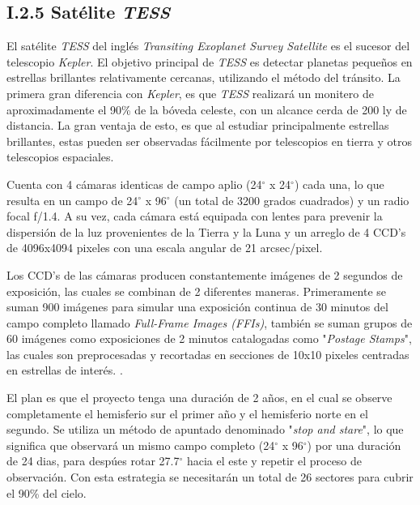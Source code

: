 \subsection*{I.2.5 Satélite \textit{TESS}}

El satélite \textit{TESS} del inglés \textit{Transiting Exoplanet Survey Satellite} es el sucesor del telescopio \textit{Kepler}. El objetivo principal de \textit{TESS} es detectar planetas pequeños en estrellas brillantes relativamente cercanas, utilizando el método del tránsito. La primera gran diferencia con \textit{Kepler}, es que \textit{TESS} realizará un monitero de aproximadamente el 90\% de la bóveda celeste, con un alcance cerda de 200 ly de distancia. La gran ventaja de esto, es que al estudiar principalmente estrellas brillantes, estas pueden ser observadas fácilmente por telescopios en tierra y otros telescopios espaciales. 

Cuenta con 4 cámaras identicas de campo aplio (24$^{\circ}$ x 24$^{\circ}$) cada una, lo que resulta en un campo de 24$^{\circ}$ x 96$^{\circ}$ (un total de 3200 grados cuadrados) y un radio focal f/1.4. A su vez, cada cámara está equipada con lentes para prevenir la dispersión de la luz provenientes de la Tierra y la Luna y un arreglo de 4 CCD’s de 4096x4094 pixeles con una escala angular de 21 arcsec/pixel.

Los CCD's de las cámaras producen constantemente imágenes de 2 segundos de exposición, las cuales se combinan de 2 diferentes maneras. Primeramente se suman 900 imágenes para simular una exposición continua de 30 minutos del campo completo llamado \textit{ Full-Frame Images (FFIs)}, también se suman grupos de 60 imágenes como exposiciones de 2 minutos catalogadas como "\textit{Postage Stamps}", las cuales son preprocesadas y recortadas en secciones de 10x10 pixeles centradas en estrellas de interés. \cite{ricker2014transiting}.

El plan es que el proyecto tenga una duración de 2 años, en el cual se observe completamente el hemisferio sur el primer año y el hemisferio norte en el segundo. Se utiliza un método de apuntado denominado "\textit{stop and stare}", lo que significa que observará un mismo campo completo (24$^{\circ}$ x 96$^{\circ}$) por una duración de 24 dias, para despúes rotar 27.7$^{\circ}$ hacia el este y repetir el proceso de observación. Con esta estrategia se necesitarán un total de 26 sectores para cubrir el 90\% del cielo. \cite{schliegel2017tess}

